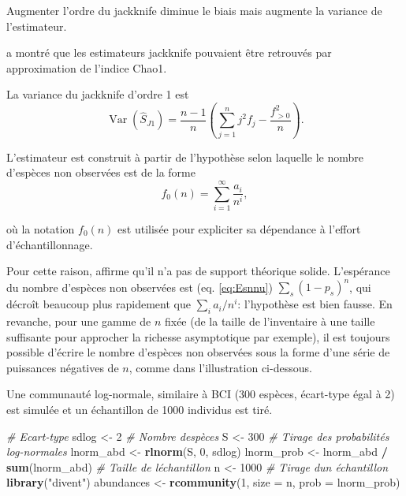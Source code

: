 \documentclass[
  11pt,
  american,
  a4paper,
  extrafontsizes,onecolumn,openright
  ]{memoir}
\newenvironment{Shaded}{\begin{snugshade}}{\end{snugshade}}
\newcommand{\AttributeTok}[1]{\textcolor[rgb]{0.13,0.29,0.53}{#1}}
\newcommand{\CommentTok}[1]{\textcolor[rgb]{0.56,0.35,0.01}{\textit{#1}}}
\newcommand{\DecValTok}[1]{\textcolor[rgb]{0.00,0.00,0.81}{#1}}
\newcommand{\FunctionTok}[1]{\textcolor[rgb]{0.13,0.29,0.53}{\textbf{#1}}}
\newcommand{\NormalTok}[1]{#1}
\newcommand{\OtherTok}[1]{\textcolor[rgb]{0.56,0.35,0.01}{#1}}
\newcommand{\SpecialCharTok}[1]{\textcolor[rgb]{0.81,0.36,0.00}{\textbf{#1}}}
\newcommand{\StringTok}[1]{\textcolor[rgb]{0.31,0.60,0.02}{#1}}
\begin{document}
Augmenter l'ordre du jackknife diminue le biais mais augmente la variance de l'estimateur.

\textcite{Chao1984} a montré que les estimateurs jackknife pouvaient être retrouvés par approximation de l'indice Chao1.

La variance du jackknife d'ordre 1 est \autocite{Heltshe1983}
\begin{equation} 
  \label{eq:VarJack1}
  \operatorname{Var}{\left( \hat{S}_\mathit{J1} \right)}
  = \frac{n - 1}{n} \left( \sum_{j = 1}^{n}{j^2 f_j} - \frac{f_{>0}^2}{n} \right).
\end{equation}

L'estimateur est construit à partir de l'hypothèse selon laquelle le nombre d'espèces non observées est de la forme
\[f_0(n) = \sum_{i = 1}^{\infty}{\frac{a_i}{n^i}},\]

où la notation \(f_0(n)\) est utilisée pour expliciter sa dépendance à l'effort d'échantillonnage.

Pour cette raison, \textcite{Cormack1989} affirme qu'il n'a pas de support théorique solide.
L'espérance du nombre d'espèces non observées est (eq. \eqref{eq:Esnnu}) \(\sum_s{(1 - p_s)^n}\), qui décroît beaucoup plus rapidement que \(\sum_{i}{{a_i}/{n^i}}\): l'hypothèse est bien fausse.
En revanche, pour une gamme de \(n\) fixée (de la taille de l'inventaire à une taille suffisante pour approcher la richesse asymptotique par exemple), il est toujours possible d'écrire le nombre d'espèces non observées sous la forme d'une série de puissances négatives de \(n\), comme dans l'illustration ci-dessous.

Une communauté log-normale, similaire à BCI (300 espèces, écart-type égal à 2) est simulée et un échantillon de 1000 individus est tiré.

\scriptsize

\begin{Shaded}
\begin{Highlighting}[]
\CommentTok{\# Ecart{-}type}
\NormalTok{sdlog }\OtherTok{\textless{}{-}} \DecValTok{2}
\CommentTok{\# Nombre d\textquotesingle{}espèces}
\NormalTok{S }\OtherTok{\textless{}{-}} \DecValTok{300}
\CommentTok{\# Tirage des probabilités log{-}normales}
\NormalTok{lnorm\_abd }\OtherTok{\textless{}{-}} \FunctionTok{rlnorm}\NormalTok{(S, }\DecValTok{0}\NormalTok{, sdlog)}
\NormalTok{lnorm\_prob }\OtherTok{\textless{}{-}}\NormalTok{ lnorm\_abd }\SpecialCharTok{/} \FunctionTok{sum}\NormalTok{(lnorm\_abd)}
\CommentTok{\# Taille de l\textquotesingle{}échantillon}
\NormalTok{n }\OtherTok{\textless{}{-}} \DecValTok{1000}
\CommentTok{\# Tirage d\textquotesingle{}un échantillon}
\FunctionTok{library}\NormalTok{(}\StringTok{"divent"}\NormalTok{)}
\NormalTok{abundances }\OtherTok{\textless{}{-}} \FunctionTok{rcommunity}\NormalTok{(}\DecValTok{1}\NormalTok{, }\AttributeTok{size =}\NormalTok{ n, }\AttributeTok{prob =}\NormalTok{ lnorm\_prob)}
\end{Highlighting}
\end{Shaded}
\end{document}
